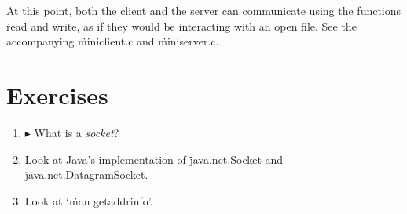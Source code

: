 At this point, both the client and the server can communicate
  using the functions \.{read} and \.{write},
  as if they would be interacting with an open file.
See the accompanying \.{miniclient.c} and \.{miniserver.c}.


\section*{Exercises}

\begin{enumerate}
\item
  $\blacktriangleright$
  What is a \emph{socket}?
\item
  Look at Java's implementation of
    \.{java.net.Socket} and \.{java.net.DatagramSocket}.
\item
  Look at `\.{man getaddrinfo}'.
\end{enumerate}




